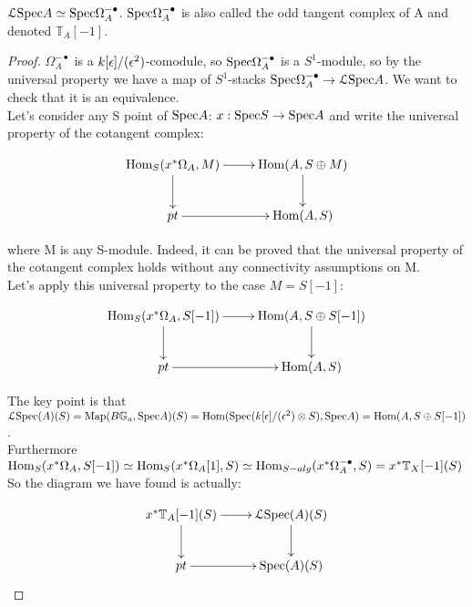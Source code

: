 \begin{refsection}
\begin{proposition}
$\mathcal{L}\mathrm{Spec} A \simeq \mathrm{Spec}\Omega_A^{-\bullet}$. $\mathrm{Spec}\Omega_A^{-\bullet}$ is also called the odd tangent complex of A and denoted $\mathbb{T}_A[-1]$.
\end{proposition}

\begin{proof} $\Omega_A^{-\bullet}$ is a $k[\epsilon]/(\epsilon^2)$-comodule, so $\mathrm{Spec}\Omega_A^{-\bullet}$ is a $S^1$-module, so by the universal property we have a map of $S^1$-stacks
$\mathrm{Spec}\Omega_A^{-\bullet}\to \mathcal{L}\mathrm{Spec} A$. We want to check that it is an equivalence.\\

Let's consider any S point of $\mathrm{Spec} A$: $x:\mathrm{Spec} S\to \mathrm{Spec} A$ and write the universal property of the cotangent complex:

\begin{displaymath}
\xymatrix{
\Hom_S(x^*\Omega_A, M) \ar[r] \ar[d] &  \Hom(A,S\oplus M) \ar[d]\\
 pt \ar[r] & \Hom(A,S)\\
}
\end{displaymath}

where M is any S-module. Indeed, it can be proved \cite{ha} that the universal property of the cotangent complex holds without any connectivity assumptions on M.\\
Let's apply this universal property to the case $M=S[-1]$:

\begin{displaymath}
\xymatrix{
\Hom_S(x^*\Omega_A, S[-1]) \ar[r] \ar[d] &  \Hom(A,S\oplus S[-1]) \ar[d]\\
 pt \ar[r] & \Hom(A,S)\\
}
\end{displaymath}

The key point is that $\mathcal{L} \mathrm{Spec}(A)(S)=\operatorname{\mathrm{Map}}(B\mathbb{G}_a,\mathrm{Spec} A)(S)=\mathrm{Hom}(\mathrm{Spec}(k[\epsilon]/(\epsilon^2)\otimes S),\mathrm{Spec} A)=\mathrm{Hom}(A,S\oplus S[-1] )$.\\
Furthermore $\mathrm{Hom}_S(x^*\Omega_A, S[-1])\simeq \mathrm{Hom}_S(x^*\Omega_A[1], S)\simeq \mathrm{Hom}_{S-alg}(x^*\Omega_A^{-\bullet}, S)=x^*\mathbb{T}_X[-1](S)$\\
So the diagram we have found is actually:

\begin{displaymath}
\xymatrix{
x^*\mathbb{T}_A[-1](S) \ar[r] \ar[d] &  \mathcal{L}\spec(A)(S) \ar[d]\\
 pt \ar[r] & \spec(A)(S)\\
}
\end{displaymath}


\end{proof}
\end{refsection}

